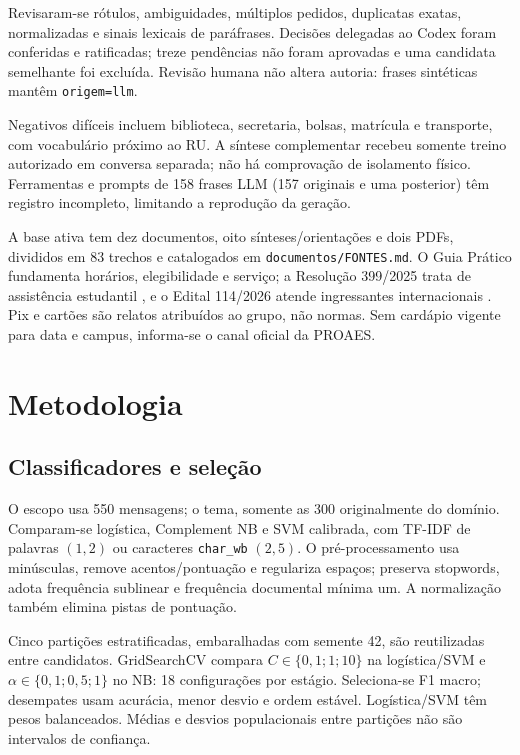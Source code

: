 \documentclass[12pt]{article}
\begin{document}
Revisaram-se rótulos, ambiguidades, múltiplos pedidos, duplicatas exatas,
normalizadas e sinais lexicais de paráfrases. Decisões delegadas ao Codex
foram conferidas e ratificadas; treze pendências não foram aprovadas
e uma candidata semelhante foi excluída. Revisão humana não altera autoria:
frases sintéticas mantêm \texttt{origem=llm}.

Negativos difíceis incluem biblioteca, secretaria, bolsas, matrícula e transporte,
com vocabulário próximo ao RU. A síntese complementar
recebeu somente treino autorizado em conversa separada; não há comprovação de
isolamento físico. Ferramentas e prompts de 158 frases LLM (157 originais e uma
posterior) têm registro incompleto, limitando a reprodução da geração.

A base ativa tem dez documentos, oito sínteses/orientações e dois PDFs, divididos
em 83 trechos e catalogados em \texttt{documentos/FONTES.md}.
O Guia Prático \cite{ufmsguia} fundamenta horários, elegibilidade e serviço;
a Resolução 399/2025 trata de assistência estudantil \cite{ufms399}, e o
Edital 114/2026 atende ingressantes internacionais \cite{ufms114}.
Pix e cartões são relatos atribuídos ao grupo, não normas. Sem cardápio vigente
para data e campus, informa-se o canal oficial da PROAES.

\section{Metodologia}
\subsection{Classificadores e seleção}
O escopo usa 550 mensagens; o tema, somente as 300 originalmente do domínio.
Comparam-se logística, Complement NB e SVM calibrada, com TF-IDF de palavras
$(1,2)$ ou caracteres \texttt{char\_wb} $(2,5)$. O pré-processamento usa
minúsculas, remove acentos/pontuação e regulariza espaços; preserva stopwords,
adota frequência sublinear e frequência documental mínima um. A normalização
também elimina pistas de pontuação.

Cinco partições estratificadas, embaralhadas com semente 42, são reutilizadas
entre candidatos. GridSearchCV compara \(C\in\{0{,}1;1;10\}\) na logística/SVM
e \(\alpha\in\{0{,}1;0{,}5;1\}\) no NB: 18 configurações por estágio.
Seleciona-se F1 macro; desempates usam acurácia, menor desvio e ordem estável.
Logística/SVM têm pesos balanceados. Médias e desvios populacionais entre
partições não são intervalos de confiança.
\end{document}
